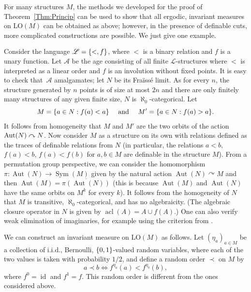 \documentclass[11pt]{article}
\providecommand{\And}{}\numberwithin{equation}{section}
\let\mathcal\mathscr
\let\actson\curvearrowright
\theoremstyle{plain}
\theoremstyle{definition}
\newcommand{\cA}{\mathcal{A}}
\newcommand{\cL}{\mathcal{L}}
\DeclareMathOperator{\acl}{acl}
\DeclareMathOperator{\Aut}{Aut}
\DeclareMathOperator{\id}{id}
\DeclareMathOperator{\Sym}{Sym}
\DeclarePairedDelimiter\set{\{}{\}}
\newcommand{\LO}{\mathrm{LO}}
\renewcommand{\And}{\text{ and }}
\newcommand{\cl}[2][]{\overline{#2}^{#1}}
\begin{document}
For many structures $M$, the methods we developed for the proof of Theorem~\ref{Thm:Princip} can be used to show that all ergodic, invariant measures on $\LO(M)$ can be obtained as above; however, in the presence of definable cuts, more complicated constructions are possible. We just give one example.

Consider the language $\cL = \set{<, f}$, where $<$ is a binary relation and $f$ is a unary function. Let $\cA$ be the age consisting of all finite $\cL$-structures where $<$ is interpreted as a linear order and $f$ is an involution without fixed points. It is easy to check that~$\cA$ amalgamates; let $N$ be its Fraïssé limit. As for every $n$, the structure generated by $n$ points is of size at most $2n$ and there are only finitely many structures of any given finite size, $N$ is $\aleph_0$-categorical. Let
\[
M = \set{a \in N : f(a) < a}\quad\And\quad M' = \set{a \in N : f(a) > a}.
\]
It follows from homogeneity that $M$ and $M'$ are the two orbits of the action $\Aut(N) \actson\nobreak N$. Now consider $M$ as a structure on its own with relations defined as the traces of definable relations from $N$ (in particular, the relations $a < b$, $f(a) < b$, $f(a) < f(b)$ for $a, b \in M$ are definable in the structure $M$). From a permutation group perspective, we can consider the homomorphism $\pi \colon \Aut(N) \to \Sym(M)$ given by the natural action $\Aut(N) \actson M$ and then $\Aut(M) = \cl{\pi(\Aut(N))}$ (this is because $\Aut(M)$ and $\Aut(N)$ have the same orbits on $M^k$ for every $k$). It follows from the homogeneity of $N$ that $M$ is transitive, $\aleph_0$-categorical, and has no algebraicity. (The algebraic closure operator in $N$ is given by $\acl(A) = A \cup f(A)$.) One can also verify weak elimination of imaginaries, for example using the criterion from \cite[Prop.\,10.1]{Rideau2019}.

We can construct an invariant measure on $\LO(M)$ as follows. Let $(\eta_a)_{a \in M}$ be a collection of i.i.d., Bernoulli, $\set{0, 1}$-valued random variables, where each of the two values is taken with probability $1/2$, and define a random order $\prec$ on $M$ by
\begin{equation*}
a \prec b \iff f^{\eta_a}(a) < f^{\eta_b}(b),
\end{equation*}
where $f^0 = \id$ and $f^1 = f$. This random order is different from the ones considered above.


\end{document}
